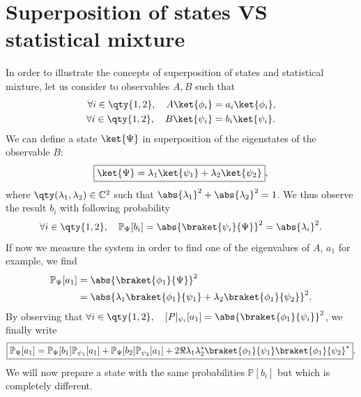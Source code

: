 \appendix
\setlength{\parskip}{2mm}\setlength{\parindent}{6mm}
\renewcommand{\thesubsection}{\thesection.\alph{subsection}\char41}
\renewcommand{\theequation}{\thesection.~\arabic{equation}}
\section{Superposition of states VS statistical mixture}\label{ann:statmix}\noindent
In order to illustrate the concepts of superposition of states and statistical mixture, let us consider to observables $A,B$ such that
\begin{align*}
    \forall i\in\qty{1,2},\quad A\ket{\phi_i}&=a_i\ket{\phi_i},\\
    \forall i\in\qty{1,2},\quad B\ket{\psi_i}&=b_i\ket{\psi_i}.
\end{align*}
We can define a state $\ket{\Psi}$ in superposition of the eigenstates of the observable $B$:
\begin{equation}
    \boxed{\ket{\Psi} = \lambda_1\ket{\psi_1}+\lambda_2\ket{\psi_2}},
\end{equation}
where $\qty(\lambda_1,\lambda_2)\in\mathbb{C}^2$ such that $\abs{\lambda_1}^2+\abs{\lambda_2}^2=1$. We thus observe the result $b_i$ with following probability
\begin{equation}
    \forall i\in\qty{1,2},\quad\mathbb{P}_\Psi[b_i]=\abs{\braket{\psi_i}{\Psi}}^2=\abs{\lambda_i}^2.
\end{equation}
If now we measure the system in order to find one of the eigenvalues of $A$, $a_1$ for example, we find
\begin{align}
    \mathbb{P}_\Psi[a_1] &= \abs{\braket{\phi_1}{\Psi}}^2\\
    &= \abs{\lambda_1\braket{\phi_1}{\psi_1}+\lambda_2\braket{\phi_1}{\psi_2}}^2\notag.
\end{align}
By observing that $\forall i\in\qty{1,2},\quad\mathbb[P]_{\psi_i}[a_1]=\abs{\braket{\phi_1}{\psi_i}}^2$, we finally write
\begin{equation}
    \boxed{\mathbb{P}_\Psi[a_1] = \mathbb{P}_\Psi[b_1]\mathbb{P}_{\psi_1}[a_1]+\mathbb{P}_\Psi[b_2]\mathbb{P}_{\psi_2}[a_1] + 2\Re{\lambda_1\lambda_2^*\braket{\phi_1}{\psi_1}\braket{\phi_1}{\psi_2}^*}}.
\end{equation}
We will now prepare a state with the same probabilities $\mathbb{P}[b_i]$ but which is completely different.

